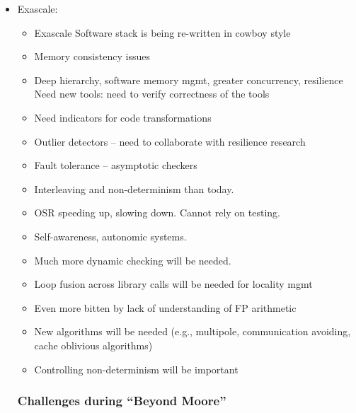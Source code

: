\begin{itemize}
\item Exascale:

 
\begin{itemize}
\item Exascale
Software stack is being re-written in cowboy style

\item Memory consistency issues

\item Deep hierarchy, software memory mgmt, greater concurrency, resilience 
Need new tools: need to verify correctness of the tools 

\item Need indicators for code transformations

\item Outlier detectors – need to collaborate with resilience research

\item Fault tolerance – asymptotic checkers

\item Interleaving and non-determinism than today.

\item OSR speeding up, slowing down. Cannot rely on testing.

\item Self-awareness, autonomic systems.

\item Much more dynamic checking will be needed.

\item Loop fusion across library calls will be needed for locality mgmt

\item Even more bitten by lack of understanding of FP arithmetic

\item New algorithms will be needed (e.g., multipole, communication avoiding, cache oblivious algorithms)

\item Controlling non-determinism will be important 

\end{itemize}
 
 \subsubsection{Challenges during ``Beyond Moore''}
 \label{sec:challenges-beyond-moore}
 

\end{itemize}
